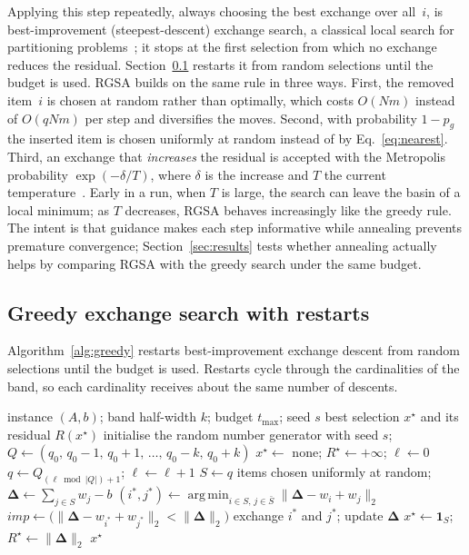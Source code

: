 \documentclass[pdflatex,sn-mathphys-num]{sn-jnl}
\theoremstyle{thmstyleone}
\theoremstyle{thmstylethree}
\newcommand{\res}{\boldsymbol{\Delta}}
\DeclareMathOperator*{\argmin}{arg\,min}
\begin{document}
Applying this step repeatedly, always choosing the best exchange over all~$i$, is best-improvement (steepest-descent) exchange search, a classical local search for partitioning problems~\cite{johnson1991}; it stops at the first selection from which no exchange reduces the residual. Section~\ref{sec:greedy} restarts it from random selections until the budget is used. RGSA builds on the same rule in three ways. First, the removed item~$i$ is chosen at random rather than optimally, which costs $O(Nm)$ instead of $O(qNm)$ per step and diversifies the moves. Second, with probability $1-p_g$ the inserted item is chosen uniformly at random instead of by Eq.~\eqref{eq:nearest}. Third, an exchange that \emph{increases} the residual is accepted with the Metropolis probability $\exp(-\delta/T)$, where $\delta$ is the increase and $T$ the current temperature~\cite{kirkpatrick1983}. Early in a run, when $T$ is large, the search can leave the basin of a local minimum; as $T$ decreases, RGSA behaves increasingly like the greedy rule. The intent is that guidance makes each step informative while annealing prevents premature convergence; Section~\ref{sec:results} tests whether annealing actually helps by comparing RGSA with the greedy search under the same budget.

\subsection{Greedy exchange search with restarts}\label{sec:greedy}
Algorithm~\ref{alg:greedy} restarts best-improvement exchange descent from random selections until the budget is used. Restarts cycle through the cardinalities of the band, so each cardinality receives about the same number of descents.

\begin{algorithm}[t]
\caption{Greedy exchange search with restarts}\label{alg:greedy}
\begin{algorithmic}[1]
\Require instance $(A,b)$; band half-width $k$; budget $t_{\max}$; seed $s$
\Ensure best selection $x^\star$ and its residual $R(x^\star)$
\State initialise the random number generator with seed $s$; $Q\gets(q_0,\,q_0-1,\,q_0+1,\,\dots,\,q_0-k,\,q_0+k)$
\State $x^\star\gets$ none; $R^\star\gets+\infty$; $\ell\gets0$
  \State $q\gets Q_{(\ell\bmod|Q|)+1}$; $\ell\gets\ell+1$ 
  \State $S\gets q$ items chosen uniformly at random; $\res\gets\sum_{j\in S}w_j-b$
  \Repeat
    \State $(i^*,j^*)\gets\argmin_{i\in S,\,j\in\bar S}\|\res-w_i+w_j\|_2$ 
    \State $\mathit{imp}\gets\big(\|\res-w_{i^*}+w_{j^*}\|_2<\|\res\|_2\big)$
     exchange $i^*$ and $j^*$; update $\res$ \EndIf
  \If{$\|\res\|_2<R^\star$} $x^\star\gets\mathbf 1_S$; $R^\star\gets\|\res\|_2$ \EndIf
\EndWhile
\State \Return $x^\star$
\end{algorithmic}
\end{algorithm}
\end{document}
